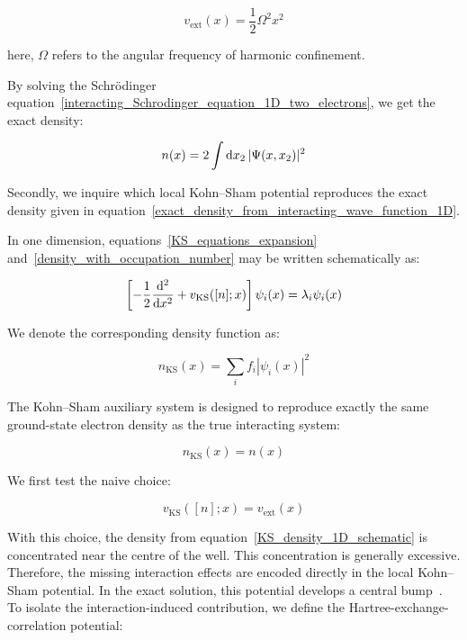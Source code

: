 \begin{equation}
    v_\mathrm{ext}(x)=\frac{1}{2}\Omega^2 x^2
\label{harmonic_external_potential_1D}
\end{equation}

here, $\Omega$ refers to the angular frequency of harmonic confinement.

By solving the Schrödinger equation~\eqref{interacting_Schrodinger_equation_1D_two_electrons},
we get the exact density:

\begin{equation}
    n(x)=2\int\mathrm{d}{x_2}\,|\Psi(x,x_2)|^2
\label{exact_density_from_interacting_wave_function_1D}
\end{equation}

Secondly, we inquire which local Kohn--Sham potential reproduces the exact density given in equation~\eqref{exact_density_from_interacting_wave_function_1D}.

In one dimension, equations~\eqref{KS_equations_expansion} and~\eqref{density_with_occupation_number} may be written schematically as:

\begin{equation}
    \left[-\frac{1}{2}\frac{\mathrm{d}^2}{\mathrm{d} x^2} + v_\mathrm{KS}([n];x)\right]\psi_i(x) = \lambda_i\psi_i(x)
\label{KS_equation_1D_schematic}
\end{equation}

We denote the corresponding density function as:

\begin{equation}
    n_\mathrm{KS}(x)=\sum_i f_i |\psi_i(x)|^2
\label{KS_density_1D_schematic}
\end{equation}

The Kohn--Sham auxiliary system is designed to reproduce exactly the same ground-state electron density as the true interacting system:

\begin{equation}
    n_\mathrm{KS}(x)=n(x)
\label{KS_exact_density_matching_1D}
\end{equation}

We first test the naive choice:

\begin{equation}
    v_\mathrm{KS}([n];x)=v_\mathrm{ext}(x)
\label{naive_KS_choice_external_only_1D}
\end{equation}

With this choice, the density from equation~\eqref{KS_density_1D_schematic} is concentrated near the centre of the well.
This concentration is generally excessive.
Therefore, the missing interaction effects are encoded directly in the local Kohn--Sham potential.
In the exact solution, this potential develops a central bump~\cite{helbig2009exact}.
To isolate the interaction-induced contribution,
we define the Hartree-exchange-correlation potential:

